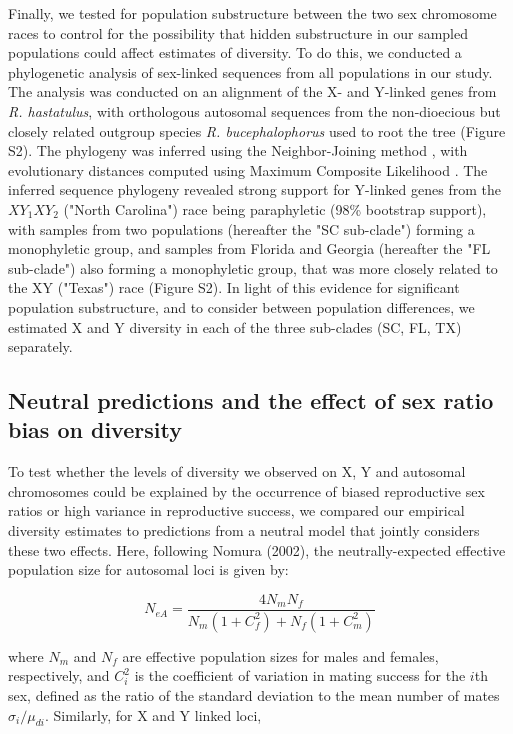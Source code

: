 \documentclass[9pt,twocolumn,twoside]{gsajnl}
\begin{document}
Finally, we tested for population substructure between the two sex chromosome races to control for the possibility that hidden substructure in our sampled populations could affect estimates of diversity. To do this, we conducted a phylogenetic analysis of sex-linked sequences from all populations in our study. The analysis was conducted on an alignment of the X- and Y-linked genes from \textit{R. hastatulus}, with orthologous autosomal sequences from the non-dioecious but closely related outgroup species \textit{R. bucephalophorus} used to root the tree (Figure S2). The phylogeny was inferred using the Neighbor-Joining method \citep{saitou1987neighbor}, with evolutionary distances computed using Maximum Composite Likelihood \citep{tamura2011mega5}. The inferred sequence phylogeny revealed strong support for Y-linked genes from the $XY_{1}XY_{2}$ ("North Carolina") race being paraphyletic (98\% bootstrap support), with samples from two populations (hereafter the "SC sub-clade") forming a monophyletic group, and samples from Florida and Georgia (hereafter the "FL sub-clade") also forming a monophyletic group, that was more closely related to the XY ("Texas") race (Figure S2). In light of this evidence for significant population substructure, and to consider between population differences, we estimated X and Y diversity in each of the three sub-clades (SC, FL, TX) separately.  

\subsection*{Neutral predictions and the effect of sex ratio bias on diversity}
To test whether the levels of diversity we observed on X, Y and autosomal chromosomes could be explained by the occurrence of biased reproductive sex ratios or high variance in reproductive success, we compared our empirical diversity estimates to predictions from a neutral model that jointly considers these two effects. Here, following Nomura (2002), the neutrally-expected effective population size for autosomal loci is given by:

\begin{equation}
N_{e{A}} = \frac{4N_{m}N_{f}}{N_{m}(1+C^2_{f})+N_{f}(1+C^2_{m})}\label{eq:NeA}
\end{equation}

where $N_{m}$ and $N_{f}$ are effective population sizes for males and females, respectively, and $C^2_{i}$ is the coefficient of variation in mating success for the $i$th sex, defined as the ratio of the standard deviation to the mean number of mates $\sigma_{i}/\mu_{d{i}}$. Similarly, for X and Y linked loci, 
\end{document}
